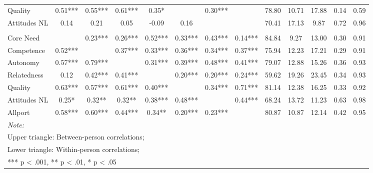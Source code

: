 \begin{table}
\begin{minipage}[t][\textheight][t]{\textwidth}
{\begin{tabular}[t]{lcccccccccccc}
\hspace{1em}Quality & 0.51*** & 0.55*** & 0.61*** & 0.35* &  & 0.30*** &  & 78.80 & 10.71 & 17.88 & 0.14 & 0.59\\
\hspace{1em}Attitudes NL & 0.14 & 0.21 & 0.05 & -0.09 & 0.16 &  &  & 70.41 & 17.13 & 9.87 & 0.72 & 0.96\\
\addlinespace[0.3em]
\multicolumn{13}{l}{\textbf{Study 3}}\\
\hspace{1em}Core Need &  & 0.23*** & 0.26*** & 0.52*** & 0.33*** & 0.43*** & 0.14*** & 84.84 & 9.27 & 13.00 & 0.30 & 0.91\\
\hspace{1em}Competence & 0.52*** &  & 0.37*** & 0.33*** & 0.36*** & 0.34*** & 0.37*** & 75.94 & 12.23 & 17.21 & 0.29 & 0.91\\
\hspace{1em}Autonomy & 0.57*** & 0.79*** &  & 0.31*** & 0.39*** & 0.48*** & 0.41*** & 79.07 & 12.88 & 15.26 & 0.36 & 0.93\\
\hspace{1em}Relatedness & 0.12 & 0.42*** & 0.41*** &  & 0.20*** & 0.20*** & 0.24*** & 59.62 & 19.26 & 23.45 & 0.34 & 0.93\\
\hspace{1em}Quality & 0.63*** & 0.57*** & 0.61*** & 0.40*** &  & 0.34*** & 0.71*** & 81.14 & 12.38 & 16.25 & 0.33 & 0.92\\
\hspace{1em}Attitudes NL & 0.25* & 0.32** & 0.32** & 0.38*** & 0.48*** &  & 0.44*** & 68.24 & 13.72 & 11.23 & 0.63 & 0.98\\
\hspace{1em}Allport & 0.58*** & 0.60*** & 0.44*** & 0.34** & 0.20*** & 0.23*** &  & 80.87 & 10.87 & 12.14 & 0.42 & 0.95\\
\bottomrule
\multicolumn{13}{l}{\rule{0pt}{1em}\textit{Note: }}\\
\multicolumn{13}{l}{\rule{0pt}{1em}Upper triangle: Between-person correlations;}\\
\multicolumn{13}{l}{\rule{0pt}{1em}Lower triangle: Within-person correlations;}\\
\multicolumn{13}{l}{\rule{0pt}{1em}*** p < .001, ** p < .01,  * p < .05}\\
\end{tabular}}
\end{minipage}
\end{table}
